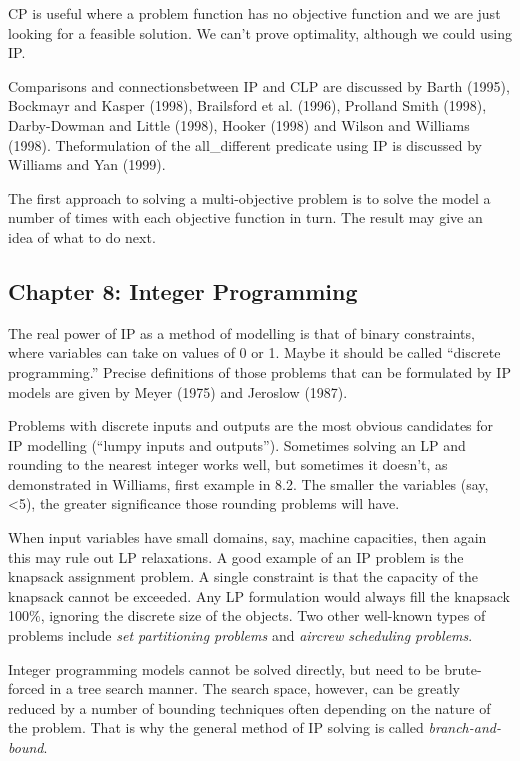 \documentclass[12pt, landscape]{article}
\begin{document}
CP is useful where a problem function has no objective function and we are just looking for a feasible solution. We can't prove optimality, although we could using IP.

Comparisons and connectionsbetween IP and CLP are discussed by Barth (1995), Bockmayr and Kasper (1998), Brailsford
et al.
(1996), Prolland Smith (1998), Darby-Dowman and Little (1998), Hooker (1998) and Wilson and Williams (1998). Theformulation of the all\_different predicate using IP is discussed by Williams and Yan (1999).

The first approach to solving a multi-objective problem is to solve the model a number of times with each objective function in turn. The result may give an idea of what to do next.


\subsection{Chapter 8: Integer Programming}

The real power of IP as a method of modelling is that of binary constraints, where variables can take on values of 0 or 1. Maybe it should be called ``discrete programming.'' Precise definitions of those problems that can be formulated by IP models are given by Meyer (1975) and Jeroslow (1987). 

Problems with discrete inputs and outputs are the most obvious candidates for IP modelling (``lumpy inputs and outputs''). Sometimes solving an LP and rounding to the nearest integer works well, but sometimes it doesn't, as demonstrated in Williams, first example in 8.2. The smaller the variables (say, <5), the greater significance those rounding problems will have. 

When input variables have small domains, say, machine capacities, then again this may rule out LP relaxations. A good example of an IP problem is the knapsack assignment problem. A single constraint is that the capacity of the knapsack cannot be exceeded. Any LP formulation would always fill the knapsack 100\%, ignoring the discrete size of the objects. Two other well-known types of problems include \textit{set partitioning problems} and \textit{aircrew scheduling problems}. 

Integer programming models cannot be solved directly, but need to be brute-forced in a tree search manner. The search space, however, can be greatly reduced by a number of bounding techniques often depending on the nature of the problem. That is why the general method of IP solving is called \textit{branch-and-bound}.
\end{document}
